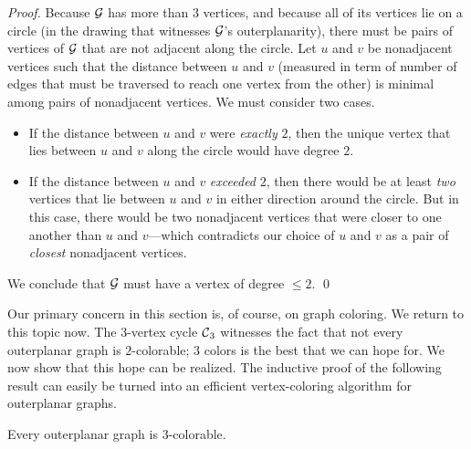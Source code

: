\begin{proof}
Because $\mbox{$\cal G$}$ has more than $3$ vertices, and because all of its vertices lie on a circle
(in the drawing that witnesses $\mbox{$\cal G$}$'s outerplanarity), there must be pairs of vertices of 
$\mbox{$\cal G$}$ that are not adjacent along the circle.  Let $u$ and $v$ be nonadjacent vertices such 
that the distance between $u$ and $v$ (measured in term of number of edges that must 
be traversed to reach one vertex from the other) is minimal among pairs of nonadjacent 
vertices.  We must consider two cases.
\begin{itemize}
\item
If the distance between $u$ and $v$ were {\em exactly} $2$, then the unique vertex
that lies between $u$ and $v$ along the circle would have degree $2$.
\item
If the distance between $u$ and $v$ {\em exceeded} $2$, then there would be at least
{\em two} vertices that lie between $u$ and $v$ in either direction around the circle.
But in this case, there would be two nonadjacent vertices that were closer to one another
than $u$ and $v$---which contradicts our choice of $u$ and $v$ as a pair of {\em closest}
nonadjacent vertices.
\end{itemize}
We conclude that $\mbox{$\cal G$}$ must have a vertex of degree $\leq 2$.  \qed
\end{proof}

\bigskip

Our primary concern in this section is, of course, on graph coloring.
We return to this topic now.  The $3$-vertex cycle $\mbox{$\cal C$}_3$ witnesses the
fact that not every outerplanar graph is $2$-colorable; $3$ colors is
the best that we can hope for.  We now show that this hope can be
realized.  The inductive proof of the following result can easily be
turned into an efficient vertex-coloring algorithm for outerplanar
graphs.

\begin{prop}
\label{thm:OP-3-colorability}
Every outerplanar graph is $3$-colorable.
\end{prop}

